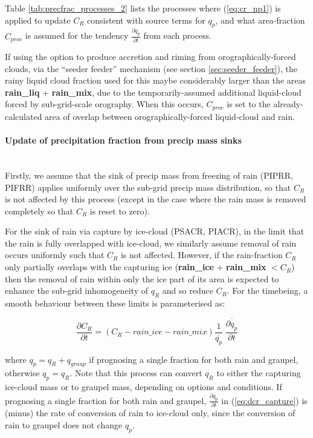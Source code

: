 \documentclass{UMDP_article}
\begin{document}
Table \ref{tab:precfrac_processes_2} lists the processes where
(\ref{eq:cr_np1}) is applied to update $C_R$ consistent with 
source terms for $q_p$, and what area-fraction $C_{proc}$ is assumed
for the tendency $\frac{\partial q_p}{\partial t}$ from each process.

If using the option to produce accretion and riming from
orographically-forced clouds, via the ``seeder feeder'' mechanism
(see section \ref{sec:seeder_feeder}), the rainy liquid cloud fraction
used for this maybe considerably larger than the areas
{\bf rain\_liq} + {\bf rain\_mix},
due to the temporarily-assumed additional liquid-cloud forced by sub-grid-scale
orography.  When this occurs, $C_{proc}$ is set to the already-calculated
area of overlap between orographically-forced liquid-cloud and rain.

\paragraph{Update of precipitation fraction from precip mass sinks}
~\\

Firstly, we assume that the sink of precip mass from freezing of rain
(PIPRR, PIFRR) applies uniformly over the sub-grid precip mass distribution,
so that $C_R$ is not affected by this process
(except in the case where the rain mass is removed completely
so that $C_R$ is reset to zero).

For the sink of rain via capture by ice-cloud (PSACR, PIACR),
in the limit that the rain is fully overlapped with ice-cloud,
we similarly assume removal of rain occurs uniformly such that
$C_R$ is not affected.
However, if the rain-fraction $C_R$ only partially overlaps with the
capturing ice ({\bf rain\_ice} + {\bf rain\_mix} $< C_R$) then the removal of
rain within only the ice part of its area is expected to enhance
the sub-grid inhomogeneity of $q_R$ and so reduce $C_R$.
For the timebeing, a smooth behaviour between these limits is
parameterised as:

\begin{equation} \label{eq:dcr_capture}
\frac{\partial C_R}{\partial t} = \left( C_R - rain\_ice - rain\_mix \right)
  \frac{1}{\overline{q_p}}
  \; \overline{ \frac{\partial q_p}{\partial t} }
\end{equation}

where $q_p = q_R + q_{graup}$ if prognosing a single fraction for both rain and
graupel, otherwise $q_p = q_R$.
Note that this process can convert $q_R$ to either the capturing ice-cloud
mass or to graupel mass, depending on options and conditions.
If prognosing a single fraction for both rain and graupel,
$\frac{\partial q_p}{\partial t}$ in (\ref{eq:dcr_capture})
is (minus) the rate of conversion of rain to ice-cloud only,
since the conversion of rain to graupel does not change $q_p$.
\end{document}

